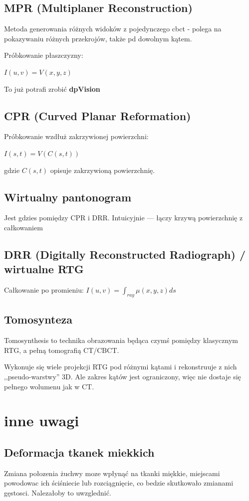 \documentclass[11pt,a4paper]{article}
\begin{document}
\subsection{MPR (Multiplaner Reconstruction)}
Metoda generowania różnych widoków z pojedynczego cbct - polega na pokazywaniu różnych przekrojów, także pd dowolnym kątem.

Próbkowanie płaszczyzny:

$I(u,v)=V(x,y,z)$

To już potrafi zrobić \textbf{dpVision}

\subsection{CPR (Curved Planar Reformation)}

Próbkowanie wzdłuż zakrzywionej powierzchni:

$I(s,t)=V(C(s,t))$

gdzie $C(s,t)$ opisuje zakrzywioną powierzchnię.

\subsection{Wirtualny pantonogram}
Jest gdzies pomiędzy CPR i DRR. Intuicyjnie --- łączy krzywą powierzchnię z całkowaniem 

\subsection{DRR (Digitally Reconstructed Radiograph) / wirtualne RTG}

Całkowanie po promieniu:
$I(u,v)=\int_{ray}\mu(x,y,z)ds$

\subsection{Tomosynteza}
Tomosynthesis to technika obrazowania będąca czymś pomiędzy klasycznym RTG, a pełną tomografią CT/CBCT.

Wykonuje się wiele projekcji RTG pod różnymi kątami i rekonstruuje z nich ,,pseudo-warstwy'' 3D. Ale zakres kątów jest ograniczony, więc nie dostaje się pełnego wolumenu jak w CT.

\section{inne uwagi}
\subsection{Deformacja tkanek miekkich}
Zmiana połozenia żuchwy moze wpłynąć na tkanki miękkie, miejscami powodowac ich ściśniecie lub rozciągnięcie, co bedzie skutkowało zmianami  gęstosci. Nalezałoby to uwzglednić.
\end{document}
